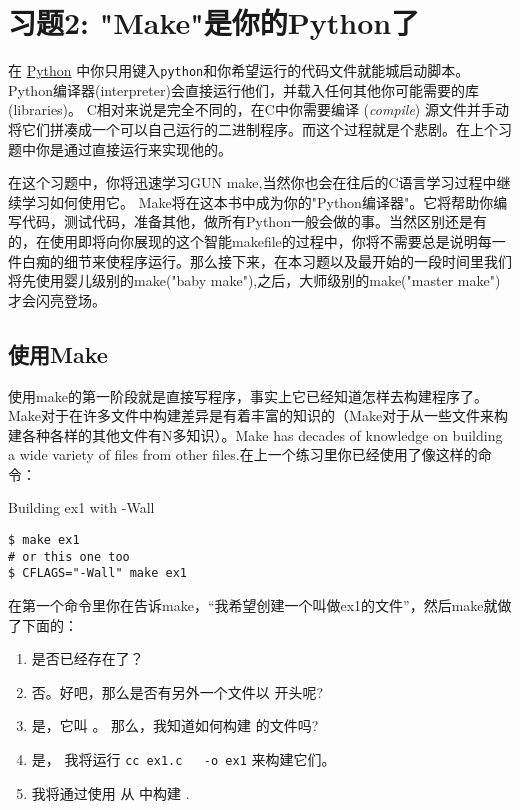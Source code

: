 \chapter{习题2: "Make"是你的Python了}

在 \href{http://learnpythonthehardway.org}{Python} 中你只用键入\verb|python|和你希望运行的代码文件就能城启动脚本。Python编译器(interpreter)会直接运行他们，并载入任何其他你可能需要的库(libraries)。 C相对来说是完全不同的，在C中你需要编译 (\emph{compile}) 源文件并手动将它们拼凑成一个可以自己运行的二进制程序。而这个过程就是个悲剧。在上个习题中你是通过直接运行来实现他的。

在这个习题中，你将迅速学习GUN make,当然你也会在往后的C语言学习过程中继续学习如何使用它。 Make将在这本书中成为你的"Python编译器"。它将帮助你编写代码，测试代码，准备其他，做所有Python一般会做的事。当然区别还是有的，在使用即将向你展现的这个智能makefile的过程中，你将不需要总是说明每一件白痴的细节来使程序运行。那么接下来，在本习题以及最开始的一段时间里我们将先使用婴儿级别的make("baby make"),之后，大师级别的make("master make")才会闪亮登场。


\section{使用Make}

使用make的第一阶段就是直接写程序，事实上它已经知道怎样去构建程序了。Make对于在许多文件中构建差异是有着丰富的知识的（Make对于从一些文件来构建各种各样的其他文件有N多知识）。Make has decades of knowledge on building
a wide variety of files from other files.在上一个练习里你已经使用了像这样的命令：

\begin{Terminal}{Building ex1 with -Wall}
\begin{lstlisting}
$ make ex1
# or this one too
$ CFLAGS="-Wall" make ex1
\end{lstlisting}
\end{Terminal}

在第一个命令里你在告诉make，“我希望创建一个叫做ex1的文件”，然后make就做了下面的：

\begin{enumerate}
\item {} 是否已经存在了？
\item 否。好吧，那么是否有另外一个文件以  开头呢?
\item 是，它叫 。 那么，我知道如何构建  的文件吗?
\item 是， 我将运行 \verb|cc ex1.c   -o ex1| 来构建它们。
\item 我将通过使用  从  中构建 .
\end{enumerate}

